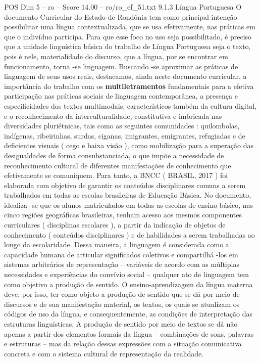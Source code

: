 \begin{textsample}{POS Dim 5 – ro – Score 14.00 – ro/ro\_ef\_51.txt}  \label{ex:f5_pos_111}
9.1.3 Língua Portuguesa O documento Curricular do Estado de Rondônia tem como principal intenção possibilitar uma língua contextualizada, que se usa efetivamente, nas práticas em que o indivíduo participa.
Para que esse foco no uso seja possibilitado, é preciso que a unidade linguística básica do trabalho de Língua Portuguesa seja o texto, pois é nele, materialidade do discurso, que a língua, por se encontrar em funcionamento, torna -se linguagem.
Buscando -se aproximar as práticas de linguagem de seus usos reais, destacamos, ainda neste documento curricular, a importância do trabalho com os \textbf{multiletramentos} fundamentais para a efetiva participação nas práticas sociais de linguagem contemporânea, a presença e especificidades dos textos multimodais, característicos também da cultura digital, e o reconhecimento da interculturalidade, constitutiva e imbricada nas diversidades pluriétnicas, tais como as seguintes comunidades : quilombolas, indígenas, ribeirinhas, surdas, ciganas, imigrantes, emigrantes, refugiadas e de deficientes visuais ( cego e baixa visão ), como mobilização para a superação das desigualdades de forma consubstanciada, o que impõe a necessidade de reconhecimento cultural de diferentes manifestações de conhecimento que efetivamente se comuniquem.
Para tanto, a BNCC ( BRASIL, 2017 ) foi elaborada com objetivo de garantir os conteúdos disciplinares comuns a serem trabalhados em todas as escolas brasileiras de Educação Básica.
No documento, idealiza -se que os alunos matriculados em todas as escolas de ensino básico, nas cinco regiões geográficas brasileiras, tenham acesso aos mesmos componentes curriculares ( disciplinas escolares ), a partir da indicação de objetos de conhecimento ( conteúdos disciplinares ) e de habilidades a serem trabalhadas ao longo da escolaridade.
Dessa maneira, a linguagem é considerada como a capacidade humana de articular significados coletivos e compartilhá -los em sistemas arbitrários de representação – variáveis de acordo com as múltiplas necessidades e experiências do convívio social – qualquer ato de linguagem tem como objetivo a produção de sentido.
O ensino-aprendizagem da língua materna deve, por isso, ter como objeto a produção de sentido que se dá por meio de discursos e de sua manifestação material, os textos, os quais se atualizam os códigos de uso da língua, e consequentemente, as condições de interpretação das estruturas linguísticas.
A produção de sentido por meio de textos se dá não apenas a partir dos elementos formais da língua – combinações de sons, palavras e estruturas – mas da relação dessas expressões com a situação comunicativa concreta e com o sistema cultural de representação da realidade.

\end{textsample}
